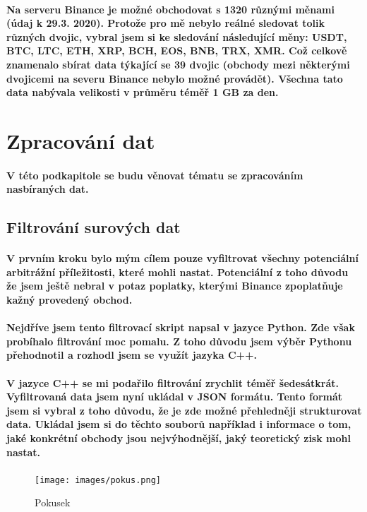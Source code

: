 \documentclass[thesis=B,czech]{FITthesis}[2019/03/21]
\begin{document}
\paragraph{
Na serveru Binance je možné obchodovat s 1320 různými měnami (údaj k 29.3. 2020). Protože pro mě nebylo reálné sledovat tolik různých dvojic, vybral jsem si ke sledování následující měny: USDT, BTC, LTC, ETH, XRP, BCH, EOS, BNB, TRX, XMR. Což celkově znamenalo sbírat data týkající se 39 dvojic (obchody mezi některými dvojicemi na severu Binance nebylo možné provádět). Všechna tato data nabývala velikosti v průměru téměř 1 GB za den.
}
\section{Zpracování dat}
\paragraph{
V této podkapitole se budu věnovat tématu se zpracováním nasbíraných dat.
}
\subsection{Filtrování surových dat}
\paragraph{
V prvním kroku bylo mým cílem pouze vyfiltrovat všechny potenciální arbitrážní příležitosti, které mohli nastat. Potenciální z toho důvodu že jsem ještě nebral v potaz poplatky, kterými Binance zpoplatňuje kažný provedený obchod.
}
\paragraph{
Nejdříve jsem tento filtrovací skript napsal v jazyce Python. Zde však probíhalo filtrování moc pomalu. Z toho důvodu jsem výběr Pythonu přehodnotil a rozhodl jsem se využít jazyka C++. 
}
\paragraph{
V jazyce C++ se mi podařilo filtrování zrychlit téměř šedesátkrát. Vyfiltrovaná data jsem nyní ukládal v JSON formátu. Tento formát jsem si vybral z toho důvodu, že je zde možné přehledněji strukturovat data. Ukládal jsem si do těchto souborů například i informace o tom, jaké konkrétní obchody jsou nejvýhodnější, jaký teoretický zisk mohl nastat. 
}
\begin{figure}\centering
	\texttt{[image: images/pokus.png]}
	\caption{Pokusek}\label{fig:pokus}
\end{figure}
\end{document}
